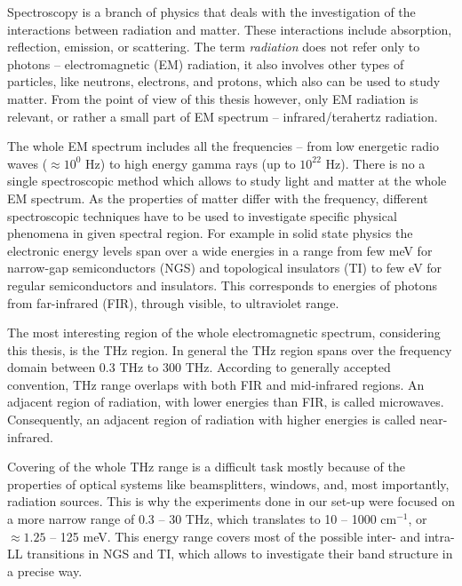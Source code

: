 \documentclass[titlepage,a4paper]{book}
\begin{document}
Spectroscopy is a branch of physics that deals with the investigation of the interactions between radiation and matter. These interactions include absorption, reflection, emission, or scattering. The term \textit{radiation} does not refer only to photons -- electromagnetic (EM) radiation, it also involves other types of particles, like neutrons, electrons, and protons, which also can be used to study matter. From the point of view of this thesis however, only EM radiation is relevant, or rather a small part of EM spectrum -- infrared/terahertz radiation.

The whole EM spectrum includes all the frequencies -- from low energetic radio waves ($\approx 10^0$ Hz) to high energy gamma rays (up to $10^22$ Hz). There is no a single spectroscopic method which allows to study light and matter at the whole EM spectrum. As the properties of matter differ with the frequency,  different spectroscopic techniques have to be used to investigate specific physical phenomena in given spectral region. For example in solid state physics the electronic energy levels span over a wide energies in a range from few meV  for narrow-gap semiconductors (NGS) and topological insulators (TI) to few eV for regular semiconductors and insulators. This corresponds to energies of photons from far-infrared (FIR), through visible, to ultraviolet range.

The most interesting region of the whole electromagnetic spectrum, considering this thesis, is the THz region. In general the THz region spans over the frequency domain between 0.3 THz to 300 THz. According to generally accepted convention, THz range overlaps with both FIR and mid-infrared regions. An adjacent region of radiation, with lower energies than FIR, is called microwaves. Consequently, an adjacent region of radiation with higher energies is called near-infrared. 

Covering of the whole THz range is a difficult task mostly because of the properties of optical systems like beamsplitters, windows, and, most importantly, radiation sources. This is why the experiments done in our set-up were focused on a more narrow range of 0.3 -- 30 THz, which translates to 10 -- 1000 cm$^{-1}$, or $\approx 1.25$ -- 125 meV. This energy range covers most of the possible inter- and intra-LL transitions in NGS and TI, which allows to investigate their band structure in a precise way.   
\end{document}
